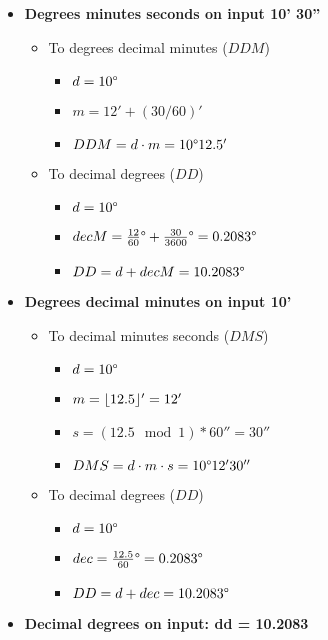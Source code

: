\begin{itemize}
	\item \textbf{Degrees minutes seconds on input 10' 30''}
	\begin{itemize}
		\item To degrees decimal minutes ($DDM$)
		\begin{itemize}
			\setlength\itemsep{0.00005em}
			\item $ d = 10\degree $
			\item $ m = 12' + (30/60)'$
			\item $DDM = d \cdot m = 10\degree 12.5' $
		\end{itemize}
		\item To decimal degrees ($DD$)
		\begin{itemize}
			\setlength\itemsep{0.00005em}
			\item $ d = 10\degree $
			\item $ decM = \frac{12}{60}\degree + \frac{30}{3600}\degree = 0.2083\degree$
			\item $ DD = d + decM = 10.2083\degree $
		\end{itemize}
	\end{itemize}
	\item \textbf{Degrees decimal minutes on input 10'}
	\begin{itemize}
		\item To decimal minutes seconds ($DMS$)
		\begin{itemize}
			\setlength\itemsep{0.00005em}
			\item $ d = 10\degree $
			\item $ m = \lfloor12.5\rfloor' = 12' $
			\item $ s = (12.5 \mod 1) * 60'' = 30''$
			\item $ DMS = d \cdot m \cdot s = 10\degree 12' 30''$
		\end{itemize}
		\item To decimal degrees ($DD$)
		\begin{itemize}
			\setlength\itemsep{0.00005em}
			\item $ d = 10\degree $
			\item $ dec = \frac{12.5}{60}\degree = 0.2083\degree$
			\item $ DD = d + dec = 10.2083\degree$
		\end{itemize}
	\end{itemize}
	\item \textbf{Decimal degrees on input: dd = 10.2083\degree}
	\begin{itemize}

\end{itemize}
\end{itemize}
